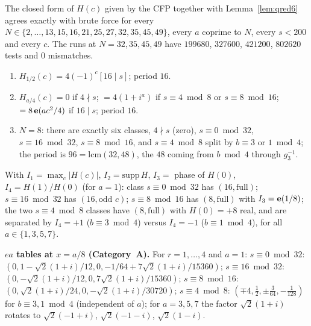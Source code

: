 \begin{proposition}\label{prop:gen7}
The closed form of $H(c)$ given by the CFP together with Lemma~\ref{lem:qred6} agrees exactly with brute force for every $N\in\{2,\dots,13,15,16,21,25,27,32,35,45,49\}$, every $a$ coprime to $N$, every $s<200$ and every $c$. The runs at $N=32,35,45,49$ have $199680$, $327600$, $421200$, $802620$ tests and $0$ mismatches.
\end{proposition}
\begin{proposition}\label{prop:evenN7}
\begin{enumerate}[label=(\roman*)]
\item $H_{1/2}(c)=4(-1)^c[16\mid s]$; period $16$.
\item $H_{a/4}(c)=0$ if $4\nmid s$; $=4(1+i^a)$ if $s\equiv4\bmod8$ or $s\equiv8\bmod16$; $=8\,\mathbf{e}(ac^2/4)$ if $16\mid s$; period $16$.
\item $N=8$: there are exactly six classes, $4\nmid s$ (zero), $s\equiv0\bmod32$, $s\equiv16\bmod32$, $s\equiv8\bmod16$, and $s\equiv4\bmod8$ split by $b\equiv3$ or $1\bmod4$; the period is $96=\mathrm{lcm}(32,48)$, the $48$ coming from $b\bmod4$ through $g_3^{-1}$.
\end{enumerate}
\end{proposition}
\begin{proposition}[The six $N=8$ classes are pairwise distinct]\label{prop:n8dist7}
With $I_1=\max_c|H(c)|$, $I_2=\mathrm{supp}\,H$, $I_3=$ phase of $H(0)$, $I_4=H(1)/H(0)$ (for $a=1$): class $s\equiv0\bmod32$ has $(16,\text{full})$; $s\equiv16\bmod32$ has $(16,\text{odd }c)$; $s\equiv8\bmod16$ has $(8,\text{full})$ with $I_3=\mathbf{e}(1/8)$; the two $s\equiv4\bmod8$ classes have $(8,\text{full})$ with $H(0)=+8$ real, and are separated by $I_4=+1$ ($b\equiv3\bmod4$) versus $I_4=-1$ ($b\equiv1\bmod4$), for all $a\in\{1,3,5,7\}$.
\end{proposition}
\noindent\textbf{$ea$ tables at $x=a/8$ (Category~A).} For $r=1,\dots,4$ and $a=1$: $s\equiv0\bmod32$: $(0,1-\sqrt2(1+i)/12,0,-1/64+7\sqrt2(1+i)/15360)$; $s\equiv16\bmod32$: $(0,-\sqrt2(1+i)/12,0,7\sqrt2(1+i)/15360)$; $s\equiv8\bmod16$: $(0,\sqrt2(1+i)/24,0,-\sqrt2(1+i)/30720)$; $s\equiv4\bmod8$: $(\mp4,\tfrac12,\pm\tfrac3{64},-\tfrac1{128})$ for $b\equiv3,1\bmod4$ (independent of $a$); for $a=3,5,7$ the factor $\sqrt2(1+i)$ rotates to $\sqrt2(-1+i)$, $\sqrt2(-1-i)$, $\sqrt2(1-i)$.

